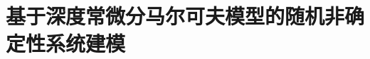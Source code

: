 \chapter{基于深度常微分马尔可夫模型的随机非确定性系统建模}
\renewcommand{\b}{\boldsymbol}   %
\newcommand{\zt}{\boldsymbol{z}_{t_i}}
\newcommand{\st}{\boldsymbol{s}_{t_i}}
\newcommand{\hti}{\boldsymbol{h}_{t_i}}
\newcommand{\thti}{\boldsymbol{\tilde{h}}_{t_i}}
\newcommand{\ut}{\boldsymbol{u}_{t_i}}
\newcommand{\yt}{\boldsymbol{y}_{t_i}}
\newcommand{\ct}{\boldsymbol{c}_{t_{i}}}
\newcommand{\rt}{\boldsymbol{r}_{t}}

\newcommand{\ztm}{\boldsymbol{z}_{t_{i-1}}}
\newcommand{\stm}{\boldsymbol{s}_{t_{i-1}}}
\newcommand{\htm}{\boldsymbol{h}_{t_{i-1}}}
\newcommand{\utm}{\boldsymbol{u}_{t_{i-1}}}
\newcommand{\ytm}{\boldsymbol{y}_{t_{i-1}}}
\newcommand{\ctm}{\boldsymbol{c}_{t_{i-1}}}
\newcommand{\thtm}{\boldsymbol{\tilde{h}}_{t_{i-1}}}

\newcommand{\ztp}{\boldsymbol{z}_{t_{i+1}}}
\newcommand{\stp}{\boldsymbol{s}_{t_{i+1}}}
\newcommand{\htp}{\boldsymbol{h}_{t_{i+1}}}
\newcommand{\utp}{\boldsymbol{u}_{t_{i+1}}}
\newcommand{\ytp}{\boldsymbol{y}_{t_{i+1}}}
\newcommand{\ctp}{\boldsymbol{c}_{t_{i+1}}}
\newcommand{\thtp}{\boldsymbol{\tilde{h}}_{t+i}}





